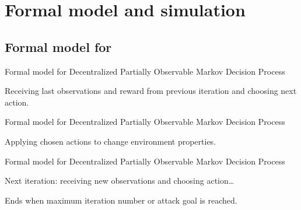 
 
 \section{Formal model and simulation}

        \subsection{Formal model for }
        
 	\begin{frame}{Formal model for }
		{Decentralized Partially Observable Markov Decision Process}

            Receiving last observations and reward from previous iteration and choosing next action.

            \begin{figure}
                \centering
                
            \end{figure}
  
	\end{frame}

 	\begin{frame}{Formal model for }
		{Decentralized Partially Observable Markov Decision Process}

            Applying chosen actions to change environment properties.

            \begin{figure}
                \centering
                
            \end{figure}
  
	\end{frame}

 	\begin{frame}{Formal model for }
		{Decentralized Partially Observable Markov Decision Process}

            Next iteration: receiving new observations and choosing action\dots

            \begin{figure}
                \centering
                
            \end{figure}

            \vspace{-0.1cm}

            Ends when maximum iteration number or attack goal is reached.
  
	\end{frame}

